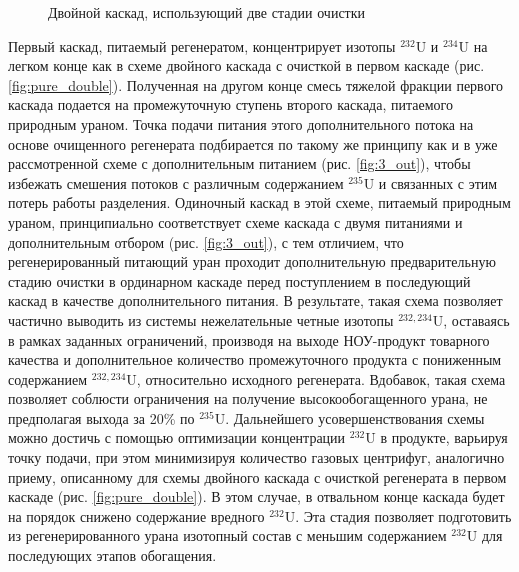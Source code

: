 \begin{figure}[ht]
  \caption{Двойной каскад, использующий две стадии очистки}\label{fig:double_palk}
\end{figure}


Первый каскад, питаемый регенератом, концентрирует изотопы $^{232}$U и $^{234}$U на легком конце как в схеме двойного каскада с очисткой в первом каскаде (рис. \ref{fig:pure_double}). Полученная на другом конце смесь тяжелой фракции первого каскада подается на промежуточную ступень второго каскада, питаемого природным ураном. Точка подачи питания этого дополнительного потока на основе очищенного регенерата подбирается по такому же принципу как и в уже рассмотренной схеме с дополнительным питанием (рис. \ref{fig:3_out}), чтобы избежать смешения потоков с различным содержанием $^{235}$U и связанных с этим потерь работы разделения. Одиночный каскад в этой схеме, питаемый природным ураном, принципиально соответствует схеме каскада с двумя питаниями и дополнительным отбором (рис. \ref{fig:3_out}), с тем отличием, что регенерированный питающий уран проходит дополнительную предварительную стадию очистки в ординарном каскаде перед поступлением в последующий каскад в качестве дополнительного питания. В результате, такая схема позволяет частично выводить из системы нежелательные четные изотопы $^{232,234}$U, оставаясь в рамках заданных ограничений, производя на выходе НОУ-продукт товарного качества и дополнительное количество промежуточного продукта с пониженным содержанием $^{232,234}$U, относительно исходного регенерата. Вдобавок, такая схема позволяет соблюсти ограничения на получение высокообогащенного урана, не предполагая выхода за 20\% по  $^{235}$U.
Дальнейшего усовершенствования схемы можно достичь с помощью оптимизации концентрации $^{232}$U в продукте, варьируя точку подачи, при этом минимизируя количество газовых центрифуг, аналогично приему, описанному для схемы двойного каскада с очисткой регенерата в первом каскаде (рис. \ref{fig:pure_double}). В этом случае, в отвальном конце каскада будет на порядок снижено содержание вредного $^{232}$U.
Эта стадия позволяет подготовить из регенерированного урана изотопный состав с меньшим содержанием $^{232}$U для последующих этапов обогащения.

